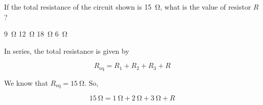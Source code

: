 \documentclass[]{exam}
\begin{document}
\begin{questions}






\question
If the total resistance of the circuit shown is \SI{15}{\ohm}, what is the value of resistor $R$?

\begin{center}
\end{center}

\begin{randomizeoneparchoices}
    \correctchoice \SI{9}{\ohm}
    \choice \SI{12}{\ohm}
    \choice \SI{18}{\ohm}
    \choice \SI{6}{\ohm}
\end{randomizeoneparchoices}


\begin{solution}
In series, the total resistance is given by

\begin{equation*}
    R_\mathrm{eq} = R_1 + R_2 + R_3 + R
\end{equation*}

We know that $R_\mathrm{eq} = \SI{15}{\ohm}$. So,

\begin{equation*}
    \SI{15}{\ohm} = \SI{1}{\ohm} + \SI{2}{\ohm} + \SI{3}{\ohm} + R
\end{equation*}


\end{solution}
\end{questions}
\end{document}
